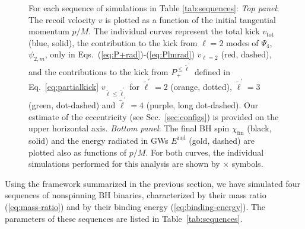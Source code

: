 \documentclass[floats,floatfix,showpacs,amssymb,prd,twocolumn,superscriptaddress,nofootinbib,nolongbibliography,reprint]{revtex4-2}
\newcommand{\mr}[1]{{\textcolor{cyan}{\sf{[MR: #1]}} }}
\newcommand{\rad}{\mathrm{rad}}
\begin{document}
\begin{figure}[t]
{    }
    \caption{For each sequence of simulations in Table \ref{tab:sequences}:
    \textit{Top panel}: The recoil velocity $v$ is plotted as a function 
    of the initial tangential momentum $p/M$. The individual curves 
    represent the total kick $v_\mathrm{tot}$ (blue, solid), the 
    contribution to the kick from $\ell=2$ modes of $\Psi_4$, $\psi_{2,m}$, 
    only in Eqs.~(\ref{eq:P+rad})-(\ref{eq:Plmrad}) $v_{\ell=2}$ 
    (red, dashed), and the contributions to the kick from 
    $P_+^{\leq \tilde{\ell}^\prime}$ defined in Eq.~\eqref{eq:partialkick}
    $v_{\tilde{\ell}\leq\tilde{\ell}^\prime} $ for $\tilde{\ell}^\prime=2$ 
    (orange, dotted), $\tilde{\ell}^\prime=3$ (green, dot-dashed) 
    and $\tilde{\ell}^\prime=4$ (purple, long dot-dashed). 
    Our estimate of the eccentricity (see Sec.~\ref{sec:configs}) is 
    provided on the upper horizontal axis.
    \textit{Bottom panel}: The final BH spin $\chi_{\mathrm{fin}}$ 
    (black, solid) and the energy radiated in GWs $E^\rad$ (gold, dashed) 
    are plotted also as functions of $p/M$. For both curves, the 
    individual simulations performed for this analysis are shown by 
    $\times$ symbols.}
    \label{fig:kicks2}
\end{figure}
%
Using the framework summarized in the previous section,
we have simulated four sequences of nonspinning BH binaries,
characterized by their mass ratio (\ref{eq:mass-ratio})
and by their binding energy (\ref{eq:binding-energy}).
The parameters of these sequences are listed in Table~\ref{tab:sequences}.
\end{document}
